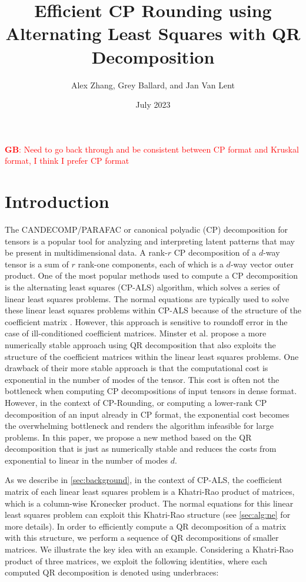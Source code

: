 \documentclass{article}
\title{Efficient CP Rounding using Alternating Least Squares with QR Decomposition}
\author{Alex Zhang, Grey Ballard, and Jan Van Lent}
\date{July 2023}
\newcommand{\GB}[1]{\textcolor{red}{\textbf{GB}: #1}}
\begin{document}
\maketitle

\GB{Need to go back through and be consistent between CP format and Kruskal format, I think I prefer CP format}

\section{Introduction}
The CANDECOMP/PARAFAC or canonical polyadic (CP) decomposition for tensors is a popular tool for analyzing and interpreting latent patterns that may be present in multidimensional data. 
A rank-$r$ CP decomposition of a $d$-way tensor is a sum of $r$ rank-one components, each of which is a $d$-way vector outer product.
One of the most popular methods used to compute a CP decomposition is the alternating least squares (CP-ALS) algorithm, which solves a series of linear least squares problems. 
The normal equations are typically used to solve these linear least squares problems within CP-ALS because of the structure of the coefficient matrix \cite{kolda2009tensor}. 
However, this approach is sensitive to roundoff error in the case of ill-conditioned coefficient matrices. 
Minster et al. \cite{MVLB23} propose a more numerically stable approach using QR decomposition that also exploits the structure of the coefficient matrices within the linear least squares problems.
One drawback of their more stable approach is that the computational cost is exponential in the number of modes of the tensor.
This cost is often not the bottleneck when computing CP decompositions of input tensors in dense format.
However, in the context of CP-Rounding, or computing a lower-rank CP decomposition of an input already in CP format, the exponential cost becomes the overwhelming bottleneck and renders the algorithm infeasible for large problems.
In this paper, we propose a new method based on the QR decomposition that is just as numerically stable and reduces the costs from exponential to linear in the number of modes $d$.


As we describe in \cref{sec:background}, in the context of CP-ALS, the coefficient matrix of each linear least squares problem is a Khatri-Rao product of matrices, which is a column-wise Kronecker product.
The normal equations for this linear least squares problem can exploit this Khatri-Rao structure (see \cref{sec:alg:ne} for more details).
In order to efficiently compute a QR decomposition of a matrix with this structure, we perform a sequence of QR decompositions of smaller matrices.
We illustrate the key idea with an example.
Considering a Khatri-Rao product of three matrices, we exploit the following identities, where each computed QR decomposition is denoted using underbraces:
\end{document}

